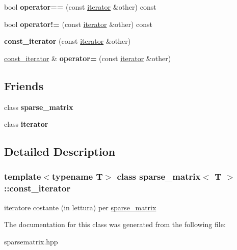 \begin{DoxyCompactItemize}
\mbox{\label{classsparse__matrix_1_1const__iterator_afff49958b85b234834360c254049d347}} 
bool {\bfseries operator==} (const \hyperlink{classsparse__matrix_1_1iterator}{iterator} \&other) const
\item 
\mbox{\label{classsparse__matrix_1_1const__iterator_a155eec088aae5789dfa905e9447ca2a7}} 
bool {\bfseries operator!=} (const \hyperlink{classsparse__matrix_1_1iterator}{iterator} \&other) const
\item 
\mbox{\label{classsparse__matrix_1_1const__iterator_afffb57e131d1e4667eb6c7dd2b26dd48}} 
{\bfseries const\+\_\+iterator} (const \hyperlink{classsparse__matrix_1_1iterator}{iterator} \&other)
\item 
\mbox{\label{classsparse__matrix_1_1const__iterator_a96882fb8a9680569b41f5507271c3404}} 
\hyperlink{classsparse__matrix_1_1const__iterator}{const\+\_\+iterator} \& {\bfseries operator=} (const \hyperlink{classsparse__matrix_1_1iterator}{iterator} \&other)
\end{DoxyCompactItemize}
\subsection*{Friends}
\begin{DoxyCompactItemize}
\item 
\mbox{\label{classsparse__matrix_1_1const__iterator_a7a67d422eb4e9951bb0c66020d5205d3}} 
class {\bfseries sparse\+\_\+matrix}
\item 
\mbox{\label{classsparse__matrix_1_1const__iterator_a67171474c4da6cc8efe0c7fafefd2b2d}} 
class {\bfseries iterator}
\end{DoxyCompactItemize}


\subsection{Detailed Description}
\subsubsection*{template$<$typename T$>$\newline
class sparse\+\_\+matrix$<$ T $>$\+::const\+\_\+iterator}

iteratore costante (in lettura) per \hyperlink{classsparse__matrix}{sparse\+\_\+matrix} 

The documentation for this class was generated from the following file\+:\begin{DoxyCompactItemize}
\item 
sparsematrix.\+hpp\end{DoxyCompactItemize}
